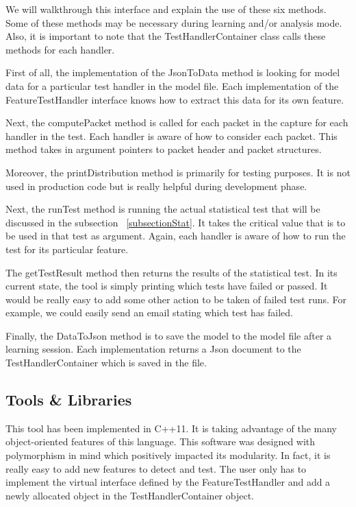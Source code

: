 \documentclass[12pt,journal,compsoc]{IEEEtran}
\begin{document}
\begin{empfile}
We will walkthrough this interface  and explain the use of these six methods. Some of these methods may be necessary during learning and/or analysis mode. Also, it is important to note that the TestHandlerContainer class calls these methods for each handler. 

First of all, the implementation of the JsonToData method is looking for model data for a particular test handler in the model file. Each implementation of the FeatureTestHandler interface knows how to extract this data for its own feature.

Next, the computePacket method is called for each packet in the capture for each handler in the test. Each handler is aware of how to consider each packet. This method takes in argument pointers to packet header and packet structures.

Moreover, the printDistribution method is primarily for testing purposes. It is not used in production code but is really helpful during development phase.

Next, the runTest method is running the actual statistical test that will be discussed in the subsection ~\ref{subsectionStat}. It takes the critical value that is to be used in that test as argument. Again, each handler is aware of how to run the test for its particular feature. 

The getTestResult method then returns the results of the statistical test. In its current state, the tool is simply printing which tests have failed or passed. It would be really easy to add some other action to be taken of failed test runs. For example, we could easily send an email stating which test has failed.

Finally, the DataToJson method is to save the model to the model file after a learning session. Each implementation returns a Json document to the TestHandlerContainer which is saved in the file.

\subsection{Tools \& Libraries}
This tool has been implemented in C++11. It is taking advantage of the many object-oriented features of this language. This software was designed with polymorphism in mind which positively impacted its modularity. In fact, it is really easy to add new features to detect and test. The user only has to implement the virtual interface defined by the FeatureTestHandler and add a newly allocated object in the TestHandlerContainer object.


\end{empfile}
\end{document}
